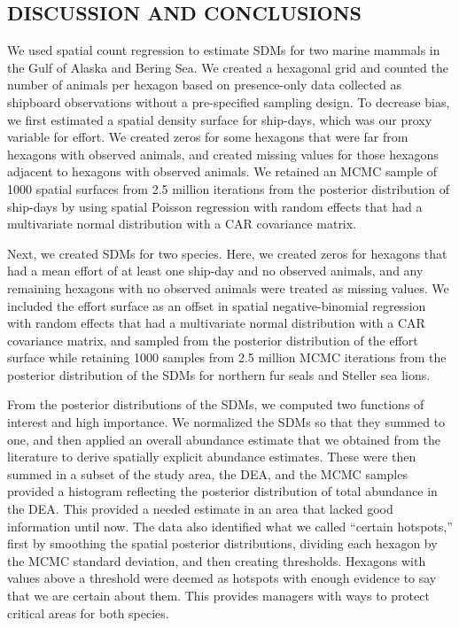 \documentclass[11pt, titlepage]{article}
\begin{document}
\begin{spacing}{1.9}
\begin{flushleft}
\section{DISCUSSION AND CONCLUSIONS}

We used spatial count regression to estimate SDMs for two marine mammals in the Gulf of Alaska and Bering Sea.  We created a hexagonal grid and counted the number of animals per hexagon based on presence-only data collected as shipboard observations without a pre-specified sampling design. To decrease bias, we first estimated a spatial density surface for ship-days, which was our proxy variable for effort.  We created zeros for some hexagons that were far from hexagons with observed animals, and created missing values for those hexagons adjacent to hexagons with observed animals.  We retained an MCMC sample of 1000 spatial surfaces from 2.5 million iterations from the posterior distribution of ship-days by using spatial Poisson regression with random effects that had a multivariate normal distribution with a CAR covariance matrix.

Next, we created SDMs for two species. Here, we created zeros for hexagons that had a mean effort of at least one ship-day and no observed animals, and any remaining hexagons with no observed animals were treated as missing values.  We included the effort surface as an offset in spatial negative-binomial regression with random effects that had a multivariate normal distribution with a CAR covariance matrix, and sampled from the posterior distribution of the effort surface while retaining 1000 samples from 2.5 million MCMC iterations from the posterior distribution of the SDMs for northern fur seals and Steller sea lions.

From the posterior distributions of the SDMs, we computed two functions of interest and high importance.  We normalized the SDMs so that they summed to one, and then applied an overall abundance estimate that we obtained from the literature to derive spatially explicit abundance estimates.  These were then summed in a subset of the study area, the DEA, and the MCMC samples provided a histogram reflecting the posterior distribution of total abundance in the DEA.  This provided a needed estimate in an area that lacked good information until now. The data also identified what we called ``certain hotspots,'' first by smoothing the spatial posterior distributions, dividing each hexagon by the MCMC standard deviation, and then creating thresholds.  Hexagons with values above a threshold were deemed as hotspots with enough evidence to say that we are certain about them. This provides managers with ways to protect critical areas for both species.


\end{flushleft}
\end{spacing}
\end{document}
